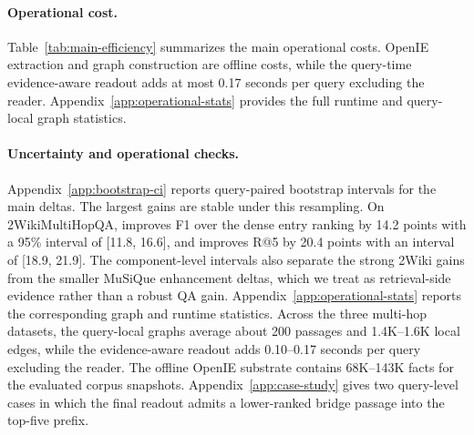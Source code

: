 \paragraph{Operational cost.}
Table~\ref{tab:main-efficiency} summarizes the main operational costs.
OpenIE extraction and graph construction are offline costs, while the
query-time evidence-aware readout adds at most 0.17 seconds per query
excluding the reader. Appendix~\ref{app:operational-stats} provides the
full runtime and query-local graph statistics.

\begin{table}[t]
\centering
\scriptsize
\setlength{\tabcolsep}{3pt}
\caption{Operational statistics for \methodname{} on the 1{,}000-query
multi-hop runs. Facts are offline OpenIE fact nodes in the corpus
snapshot. Local edges and readout time are query averages before the
GPT-4o-mini reader.}
\label{tab:main-efficiency}
\end{table}

\paragraph{Uncertainty and operational checks.}
Appendix~\ref{app:bootstrap-ci} reports query-paired bootstrap
intervals for the main deltas. The largest gains are stable under this
resampling. On 2WikiMultiHopQA, \methodname{} improves F1 over the dense
entry ranking by 14.2 points with a 95\% interval of [11.8, 16.6], and
improves R@5 by 20.4 points with an interval of [18.9, 21.9]. The
component-level intervals also separate the strong 2Wiki gains from the
smaller MuSiQue enhancement deltas, which we treat as retrieval-side
evidence rather than a robust QA gain. Appendix~\ref{app:operational-stats}
reports the corresponding graph and runtime statistics. Across the
three multi-hop datasets, the query-local graphs average about 200
passages and 1.4K--1.6K local edges, while the evidence-aware readout
adds 0.10--0.17 seconds per query excluding the reader. The offline
OpenIE substrate contains 68K--143K facts for the evaluated corpus
snapshots. Appendix~\ref{app:case-study} gives two query-level cases in
which the final readout admits a lower-ranked bridge passage into the
top-five prefix.
